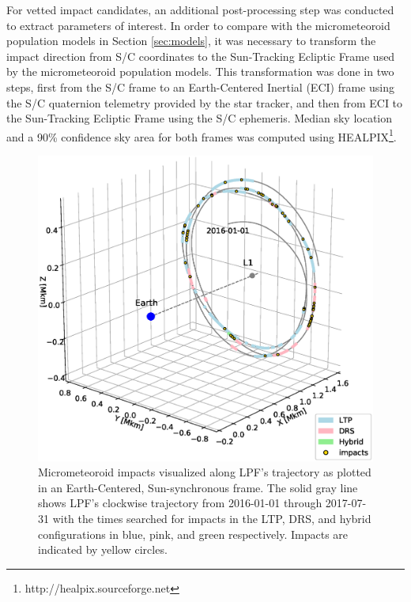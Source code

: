\documentclass[twocolumn, trackchanges]{aastex62}
\begin{document}
For vetted impact candidates, an additional post-processing step was conducted to extract parameters of interest.  In order to compare with the micrometeoroid population models in Section \ref{sec:models}, it was necessary to transform the impact direction from S/C coordinates to the Sun-Tracking Ecliptic Frame used by the micrometeoroid population models.  This transformation was done in two steps, first from the S/C frame to an Earth-Centered Inertial (ECI) frame using the S/C quaternion telemetry provided by the star tracker, and then from ECI to the Sun-Tracking Ecliptic Frame using the S/C ephemeris. Median sky location and a 90\% confidence sky area for both frames was computed using HEALPIX\footnote{http://healpix.sourceforge.net}\citep{HEALPIX}. 

\begin{figure}[t]
\includegraphics[width=\columnwidth]{figures/ephemeris.eps} 
\caption{Micrometeoroid impacts visualized along LPF's trajectory as plotted in an Earth-Centered, Sun-synchronous frame.  The solid gray line shows LPF's clockwise trajectory from 2016-01-01 through 2017-07-31 with the times searched for impacts in the LTP, DRS, and hybrid configurations in blue, pink, and green respectively. Impacts are indicated by yellow circles. \label{fig:ephemeris}}
\end{figure}
\end{document}

